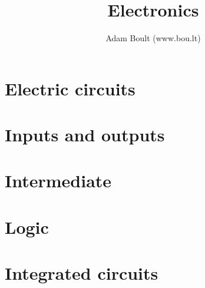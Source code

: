 \documentclass[oneside]{book}
\begin{document}
\author{Adam Boult (www.bou.lt)}
\title{Electronics}
\maketitle

\setcounter{tocdepth}{0}
\tableofcontents



\part{Electric circuits}





\part{Inputs and outputs}







\part{Intermediate}



\part{Logic}



\part{Integrated circuits}
\end{document}
